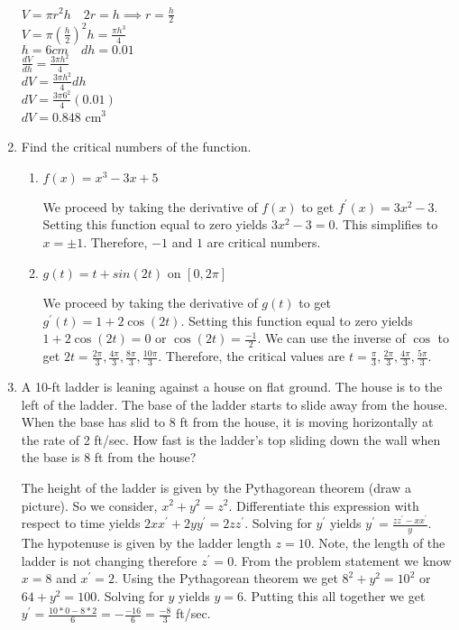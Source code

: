 \documentclass{article}
\begin{document}
\begin{enumerate}[label = \arabic*)]
	\begin{center}
	    $V = \pi r^2 h \quad 2r = h \implies r = \frac{h}{2}$\\
	    $V = \pi (\frac{h}{2})^2 h =  \frac{\pi h ^3}{4}$ \\
	    $h = 6 cm \quad dh = 0.01$ \\
	    $\frac{dV}{dh} =  \frac{3 \pi h ^2}{4}$\\
	    $dV =  \frac{3 \pi h ^2}{4} dh$\\
	    $dV = \frac{3 \pi 6 ^2}{4} (0.01)$ \\
	    $dV =  0.848$ cm$^3$
	\end{center}
	
	\item Find the critical numbers of the function.
	
	\begin{enumerate}
	    \item $f(x) = x^3 - 3x + 5$
	    
	    We proceed by taking the derivative of $f(x)$ to get $f^\prime(x) = 3x^2 - 3.$ Setting this function equal to zero yields $3x^2 - 3 = 0$. This simplifies to $x = \pm 1$. Therefore, $-1$ and $1$ are critical numbers.
	    
	    \item $g(t) = t + sin(2t)$ on $[0, 2\pi]$
	    
	    We proceed by taking the derivative of $g(t)$ to get $g^\prime(t) = 1 + 2\cos(2t).$ Setting this function equal to zero yields $ 1 + 2\cos(2t) = 0$ or  $ \cos(2t) = \frac{-1}{2}$. We can use the inverse of $\cos$ to get $2t = \frac{2\pi}{3}, \frac{4\pi}{3}, \frac{8\pi}{3}, \frac{10\pi}{3}$. Therefore, the critical values are $t = \frac{\pi}{3},\frac{2\pi}{3},\frac{4\pi}{3},\frac{5\pi}{3}$.
	    
	\end{enumerate}
	
	\item A 10-ft ladder is leaning against a house on flat ground. The house is to the left of the ladder. The base of the ladder starts to slide away from the house. When the base has slid to 8 ft from the house, it is moving horizontally at the rate of 2 ft/sec. How fast is the ladder’s top sliding down the wall when the base is 8 ft from the house?
	
	The height of the ladder is given by the Pythagorean theorem (draw a picture). So we consider, $x^2 + y^2 = z^2.$ Differentiate this expression with respect to time yields $2x x^\prime + 2y y^\prime  = 2z z^\prime .$ Solving for $y^\prime$ yields $y^\prime  = \frac{z z^\prime - x x^\prime}{y}.$ The hypotenuse is given by the ladder length $z = 10$. Note, the length of the ladder is not changing therefore $z^\prime = 0$. From the problem statement we know $x = 8$ and $x^\prime = 2$. Using the Pythagorean theorem we get $8^2 + y^2 = 10^2$ or $64 + y^2 = 100.$ Solving for $y$ yields $y = 6$. Putting this all together we get $y^\prime  = \frac{10 * 0 - 8 * 2}{6} = - \frac{-16}{6} = \frac{-8}{3}$ ft/sec.
	

\end{enumerate}
\end{document}
